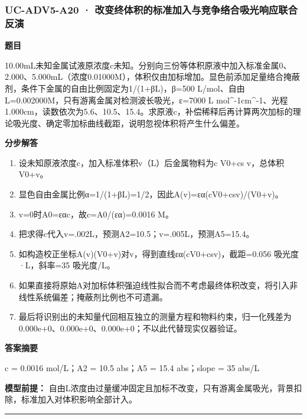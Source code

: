 \documentclass[UTF8,11pt,a4paper]{ctexart}
\begin{document}
\subsubsection*{UC-ADV5-A20 · 改变终体积的标准加入与竞争络合吸光响应联合反演}
\noindent\textbf{题目}\par
10.00mL未知金属试液原浓度c未知。分别向三份等体积原液中加入标准金属0、2.000、5.000mL（浓度0.01000M），体积仅由加标增加。显色前添加足量络合掩蔽剂，条件下金属的自由比例固定为1/(1+βL)，β=500 L/mol、自由L=0.002000M，只有游离金属对检测波长吸光，ε=7000 L mol\textasciicircum{}-1cm\textasciicircum{}-1、光程1.000cm，读数依次为5.6、10.5、15.4。求原液c，补偿稀释后再计算两次加标的理论吸光度、确定零加标曲线截距，说明忽视体积将产生什么偏差。\par
\medskip\noindent\textbf{分步解答}
\begin{enumerate}
\item 设未知原液浓度c，加入标准体积v（L）后金属物料为c V0+cs v，总体积V0+v。
\item 显色自由金属比例α=1/(1+βL)=1/2，因此A(v)=εα(cV0+csv)/(V0+v)。
\item v=0时A0=εαc，故c=A0/(εα)=0.0016 M。
\item 把求得c代入v=.002L，预测A2=10.5；v=.005L，预测A5=15.4。
\item 如构造校正坐标A(v)(V0+v)对v，得到直线εα(cV0+csv)，截距=0.056 吸光度·L，斜率=35 吸光度/L。
\item 如果直接将原始A对加标体积强迫线性拟合而不考虑最终体积改变，将引入非线性系统偏差；掩蔽剂比例也不可遗漏。
\item 最后将识别出的未知量代回相互独立的测量方程和物料约束，归一化残差为 0.000e+0、0.000e+0、0.000e+0；不以此代替现实仪器验证。
\end{enumerate}
\noindent\textbf{答案摘要}\par
c = 0.0016 mol/L；A2 = 10.5 abs；A5 = 15.4 abs；slope = 35 abs/L\par
\noindent\textbf{模型前提：}
自由L浓度由过量缓冲固定且加标不改变，只有游离金属吸光，背景扣除，标准加入对体积影响全部计入。\par
\medskip\hrule\medskip
{}
\end{document}
